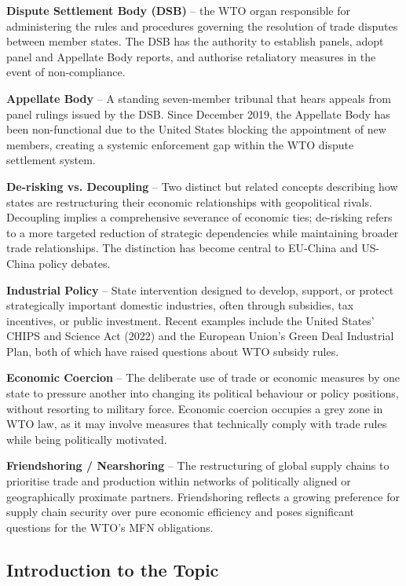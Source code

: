 \textbf{Dispute Settlement Body (DSB)} – the WTO organ responsible for administering the rules and procedures governing the resolution of trade disputes between member states. The DSB has the authority to establish panels, adopt panel and Appellate Body reports, and authorise retaliatory measures in the event of non-compliance.

\textbf{Appellate Body} – A standing seven-member tribunal that hears appeals from panel rulings issued by the DSB. Since December 2019, the Appellate Body has been non-functional due to the United States blocking the appointment of new members, creating a systemic enforcement gap within the WTO dispute settlement system.

\textbf{De-risking vs. Decoupling} – Two distinct but related concepts describing how states are restructuring their economic relationships with geopolitical rivals. Decoupling implies a comprehensive severance of economic ties; de-risking refers to a more targeted reduction of strategic dependencies while maintaining broader trade relationships. The distinction has become central to EU-China and US-China policy debates.

\textbf{Industrial Policy} – State intervention designed to develop, support, or protect strategically important domestic industries, often through subsidies, tax incentives, or public investment. Recent examples include the United States' CHIPS and Science Act (2022) and the European Union's Green Deal Industrial Plan, both of which have raised questions about WTO subsidy rules.

\textbf{Economic Coercion} – The deliberate use of trade or economic measures by one state to pressure another into changing its political behaviour or policy positions, without resorting to military force. Economic coercion occupies a grey zone in WTO law, as it may involve measures that technically comply with trade rules while being politically motivated.

\textbf{Friendshoring / Nearshoring} – The restructuring of global supply chains to prioritise trade and production within networks of politically aligned or geographically proximate partners. Friendshoring reflects a growing preference for supply chain security over pure economic efficiency and poses significant questions for the WTO's MFN obligations.

\subsection{Introduction to the Topic}


